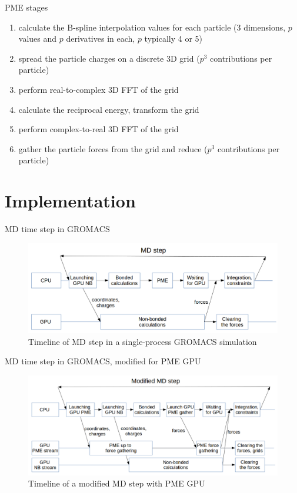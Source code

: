 \documentclass[11pt]{beamer}
\begin{document}
\begin{frame}{PME stages}
\begin{enumerate}
\item calculate the B-spline interpolation values for each particle
(3 dimensions, $p$ values and $p$ derivatives in each, $p$ typically 4 or 5)
\item spread the particle charges on a discrete 3D grid ($p^3$ contributions per particle)
\item perform real-to-complex 3D FFT of the grid
\item calculate the reciprocal energy, transform the grid
\item perform complex-to-real 3D FFT of the grid
\item gather the particle forces from the grid and reduce ($p^3$ contributions per particle)
\end{enumerate}
\end{frame}


\section{Implementation}

\begin{frame}{MD time step in GROMACS}
\begin{figure}
    \centering
    \includegraphics[width=1\textwidth]{pics/mdstep-orig.png}
    \caption{Timeline of MD step in a single-process GROMACS simulation}
    \label{fig:step-orig}
\end{figure}
\FloatBarrier
\end{frame}

\begin{frame}{MD time step in GROMACS, modified for PME GPU}
\begin{figure}
    \centering
    \includegraphics[width=1\textwidth]{pics/mdstep-gpu.png}
    \caption{Timeline of a modified MD step with PME GPU}
\end{figure}
\FloatBarrier
\end{frame}
\end{document}
